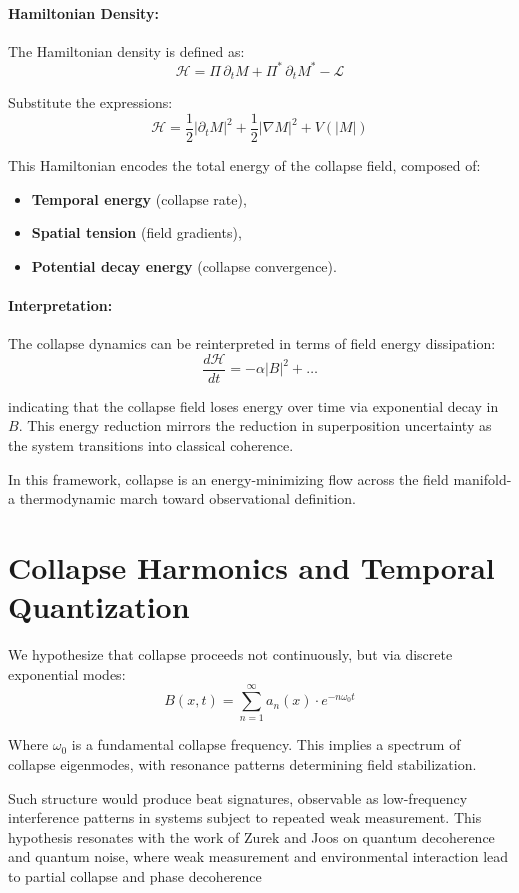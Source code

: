 \paragraph{Hamiltonian Density:}
The Hamiltonian density is defined as:
\[
\mathcal{H} = \Pi \, \partial_t M + \Pi^* \, \partial_t M^* - \mathcal{L}
\]

Substitute the expressions:
\[
\mathcal{H} = \frac{1}{2} \left| \partial_t M \right|^2 + \frac{1}{2} \left| \nabla M \right|^2 + V(|M|)
\]

This Hamiltonian encodes the total energy of the collapse field, composed of:
\begin{itemize}
  \item \textbf{Temporal energy} (collapse rate),
  \item \textbf{Spatial tension} (field gradients),
  \item \textbf{Potential decay energy} (collapse convergence). \cite{imaginary_meta} 
\end{itemize}

\paragraph{Interpretation:}
The collapse dynamics can be reinterpreted in terms of field energy dissipation:
\[
\frac{d\mathcal{H}}{dt} = - \alpha \left| B \right|^2 + \dots
\]

indicating that the collapse field loses energy over time via exponential decay in $B$. \cite{imaginary_meta} This energy reduction mirrors the reduction in superposition uncertainty as the system transitions into classical coherence. \cite{imaginary_meta} 

In this framework, collapse is an energy-minimizing flow across the field manifold-a thermodynamic march toward observational definition.


\section{Collapse Harmonics and Temporal Quantization}
We hypothesize that collapse proceeds not continuously, but via discrete exponential modes:
\[
B(x, t) = \sum_{n=1}^{\infty} a_n(x) \cdot e^{-n \omega_0 t}
\]

Where $\omega_0$ is a fundamental collapse frequency. \cite{imaginary_meta} This implies a spectrum of collapse eigenmodes, with resonance patterns determining field stabilization. \cite{imaginary_meta} 

Such structure would produce beat signatures, observable as low-frequency interference patterns in systems subject to repeated weak measurement. \cite{imaginary_meta} This hypothesis resonates with the work of Zurek and Joos on quantum decoherence and quantum noise, where weak measurement and environmental interaction lead to partial collapse and phase decoherence


